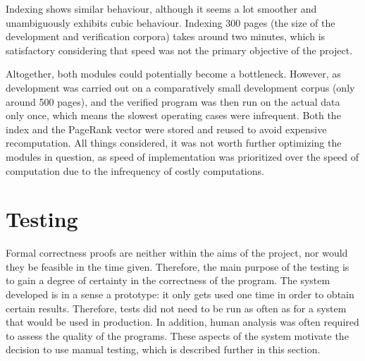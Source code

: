 \documentclass[12pt,a4paper,notitlepage,twoside]{scrbook}
\begin{document}
Indexing shows similar behaviour, although it seems a lot smoother and unambiguously exhibits cubic
behaviour. Indexing 300 pages (the size of the development and verification corpora) takes around two minutes, which is satisfactory considering
that speed was not the primary objective of the project.

Altogether, both modules could potentially become a bottleneck. However, as development
was carried out on a comparatively small development corpus (only around 500 pages), and
the verified program was then run on the actual data only once, which means the slowest operating cases
were infrequent. Both the index and the PageRank vector were stored and reused to avoid
expensive recomputation. All things considered, it was not worth further optimizing the
modules in question, as speed of implementation was prioritized over the speed of
computation due to the infrequency of costly computations. 

\section{Testing}
\label{sec:testing}
Formal correctness proofs are neither within the aims of the project, nor would they be
feasible in the time given. Therefore, the main purpose of the testing is to gain a degree
of certainty in the correctness of the program. The system developed is in a sense a
prototype: it only gets used one time in order to obtain certain results. Therefore, tests
did not need to be run as often as for a system that would be used in production. In
addition, human analysis was often required to assess the quality of the programs. These
aspects of the system motivate the decision to use manual testing, which is described
further in this section. 
\end{document}
